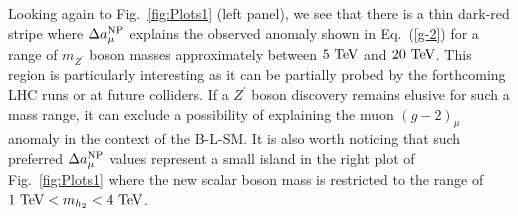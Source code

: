 Looking again to Fig.~\ref{fig:Plots1} (left panel), we see that there is a thin dark-red stripe where $\Delta a^{\textrm{NP}}_\mu$ explains the observed anomaly shown in Eq.~(\ref{g-2}) for a range of $m_{Z^\prime}$ boson masses approximately between $5~\textrm{TeV}$ and $20~\textrm{TeV}$. This region is particularly interesting as it can be partially probed by the forthcoming LHC runs or at future colliders. If a $Z^\prime$ boson discovery remains elusive for such a mass range, it can exclude a possibility of explaining the muon $\left(g-2\right)_\mu$ anomaly in the context of the B-L-SM. It is also worth noticing that such preferred $\Delta a^{\textrm{NP}}_\mu$ values represent a small island in the right plot of Fig.~\ref{fig:Plots1} where the new scalar boson mass is restricted to the range of $1~\textrm{TeV} < m_{h_2} < 4~\textrm{TeV}$.

